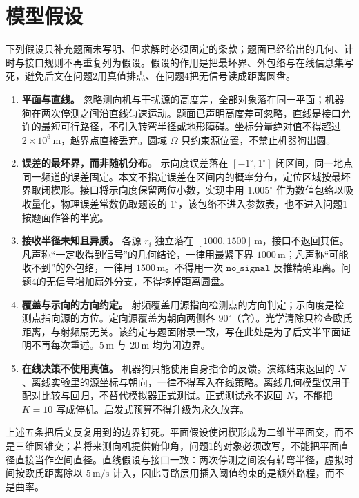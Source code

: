 \section{模型假设}

下列假设只补充题面未写明、但求解时必须固定的条款；题面已经给出的几何、计时与接口规则不再重复列为假设。假设的作用是把最坏界、外包络与在线信息集写死，避免后文在问题2用真值排点、在问题4把无信号读成距离圆盘。

\begin{enumerate}
\item \textbf{平面与直线。} 忽略测向机与干扰源的高度差，全部对象落在同一平面；机器狗在两次停测之间沿直线匀速运动。题面已声明高度差可忽略，直线是接口允许的最短可行路径，不引入转弯半径或地形障碍。坐标分量绝对值不得超过 $2\times 10^6\,\mathrm{m}$，越界点直接丢弃。圆域 $\Omega$ 只约束源位置，不禁止机器狗出圆。

\item \textbf{误差的最坏界，而非随机分布。} 示向度误差落在 $[-1^\circ,1^\circ]$ 闭区间，同一地点同一频道的误差固定。本文不指定误差在区间内的概率分布，定位区域按最坏界取闭楔形。接口将示向度保留两位小数，实现中用 $1.005^\circ$ 作为数值包络以吸收量化，物理误差常数仍取题设的 $1^\circ$，该包络不进入参数表，也不进入问题1按题面作答的半宽。

\item \textbf{接收半径未知且异质。} 各源 $r_i$ 独立落在 $[1000,1500]\,\mathrm{m}$，接口不返回其值。凡声称“一定收得到信号”的几何结论，一律用最紧下界 $1000\,\mathrm{m}$；凡声称“可能收不到”的外包络，一律用 $1500\,\mathrm{m}$。不得用一次 $\mathtt{no\_signal}$ 反推精确距离。问题4的无信号增加扇外分支，不得挖掉距离圆盘。

\item \textbf{覆盖与示向的方向约定。} 射频覆盖用源指向检测点的方向判定；示向度是检测点指向源的方位。定向源覆盖为朝向两侧各 $90^\circ$（含）。光学清除只检查欧氏距离，与射频扇无关。该约定与题面附录一致，写在此处是为了后文半平面证明不再每次重述。$5\,\mathrm{m}$ 与 $20\,\mathrm{m}$ 均为闭边界。

\item \textbf{在线决策不使用真值。} 机器狗只能使用自身指令的反馈。演练结束返回的 $N$、离线实验里的源坐标与朝向，一律不得写入在线策略。离线几何模型仅用于配对比较与回归，不替代模拟器正式测试。正式测试永不返回 $N$，不能把 $K=10$ 写成停机。启发式预算不得升级为永久放弃。
\end{enumerate}

上述五条把后文反复用到的边界钉死。平面假设使闭楔形成为二维半平面交，而不是三维圆锥交；若将来测向机提供俯仰角，问题1的对象必须改写，不能把平面直径直接当作空间直径。直线假设与接口一致：两次停测之间没有转弯半径，虚拟时间按欧氏距离除以 $5\,\mathrm{m/s}$ 计入，因此寻路层用插入阈值约束的是额外路程，而不是曲率。

